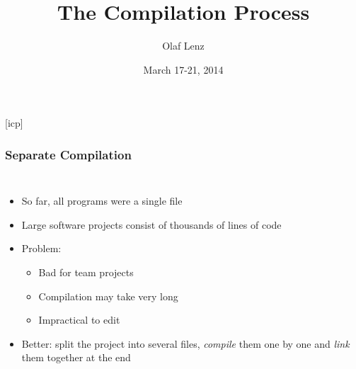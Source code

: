 \documentclass{slides}
\begin{document}
\graphicspath{{figures/}}

\title[The Compilation Process]{\Large The Compilation Process}

\author[O. Lenz]{Olaf Lenz} 
\date{March 17-21, 2014}

\begin{frame}
  \titlepage
\end {frame}
[icp]

\begin{frame}
  \frametitle{Separate Compilation}
  \begin{columns}[T,onlytextwidth]
    \begin{itemize}
    \item So far, all programs were a single file
    \item Large software projects consist of thousands of lines of
      code
    \item Problem:
      \begin{itemize}
      \item Bad for team projects
      \item Compilation may take very long
      \item Impractical to edit
      \end{itemize}
    \item Better: split the project into several files, \emph{compile}
      them one by one and \emph{link} them together at the end
    \end{itemize}


\end{columns}
\end{frame}
\end{document}
